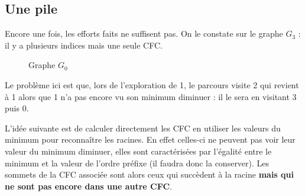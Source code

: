 \subsection{Une pile} 
Encore une fois, les efforts faits ne suffisent pas. On le constate sur le graphe $G_3$ : il y a plusieurs indices mais une seule CFC.

\begin{figure}[ht]
\begin{center}
\caption{Graphe $G_0$}
\end{center}
\end{figure}
Le problème ici est que, lors de l'exploration de 1, le parcours visite 2 qui revient à 1 alors que 1 n'a pas encore vu son minimum diminuer : il le sera en visitant 3 puis 0.

L'idée suivante est de calculer directement les CFC en utiliser les valeurs du minimum pour reconnaître les racines. En effet celles-ci ne peuvent pas voir leur valeur du minimum diminuer, elles sont caractérisées par l'égalité entre le minimum et la valeur de l'ordre préfixe (il faudra donc la conserver). Les sommets de la CFC associée sont alors ceux  qui succèdent à la racine {\bf mais qui ne sont pas encore dans une autre CFC}.

